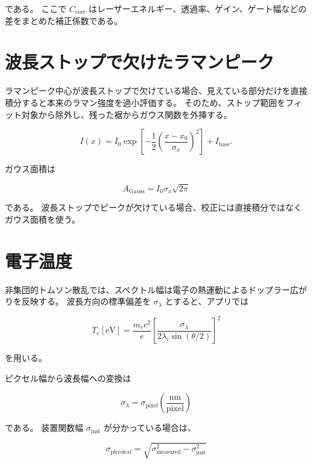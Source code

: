 \documentclass[uplatex,dvipdfmx,11pt]{jsarticle}
\begin{document}
である。
ここで $C_{\mathrm{corr}}$ はレーザーエネルギー、透過率、ゲイン、ゲート幅などの差をまとめた補正係数である。

\section{波長ストップで欠けたラマンピーク}

ラマンピーク中心が波長ストップで欠けている場合、見えている部分だけを直接積分すると本来のラマン強度を過小評価する。
そのため、ストップ範囲をフィット対象から除外し、残った裾からガウス関数を外挿する。

\begin{equation}
I(x)
=
I_0
\exp\left[
-\frac{1}{2}
\left(
\frac{x-x_0}{\sigma_x}
\right)^2
\right]
+ I_{\mathrm{base}}.
\end{equation}

ガウス面積は

\begin{equation}
A_{\mathrm{Gauss}}
=
I_0\sigma_x\sqrt{2\pi}
\end{equation}

である。
波長ストップでピークが欠けている場合、校正には直接積分ではなくガウス面積を使う。

\section{電子温度}

非集団的トムソン散乱では、スペクトル幅は電子の熱運動によるドップラー広がりを反映する。
波長方向の標準偏差を $\sigma_\lambda$ とすると、アプリでは

\begin{equation}
T_e[\mathrm{eV}]
=
\frac{m_e c^2}{e}
\left[
\frac{\sigma_\lambda}
{2\lambda_i\sin(\theta/2)}
\right]^2
\end{equation}

を用いる。

ピクセル幅から波長幅への変換は

\begin{equation}
\sigma_\lambda
=
\sigma_{\mathrm{pixel}}
\left(\frac{\mathrm{nm}}{\mathrm{pixel}}\right)
\end{equation}

である。
装置関数幅 $\sigma_{\mathrm{inst}}$ が分かっている場合は、

\begin{equation}
\sigma_{\mathrm{physical}}
=
\sqrt{
\sigma_{\mathrm{measured}}^2
-
\sigma_{\mathrm{inst}}^2
}
\end{equation}
\end{document}
